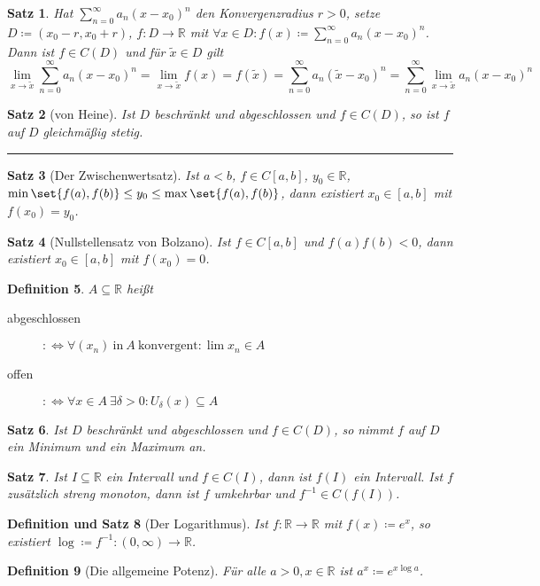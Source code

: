 \documentclass[a4paper]{article}
\newcounter{Sec}
\theoremstyle{marginbreak}
\newtheorem{definition}{Definition}[Sec]
\newtheorem{satz}[definition]{Satz}
\newtheorem{defsatz}[definition]{Definition und Satz}
\newcommand{\sep}{%
	\rule{\textwidth}{0.3pt}%
	\stepcounter{Sec}%
	}
\newcommand{\defiff}{:\Longleftrightarrow}
\newcommand{\series}[1][1]{\sum_{n=#1}^\infty}
\newcommand{\ps}[1][a]{\series[0]#1_n(x-x_0)^n}
\begin{document}
	\begin{satz}
		Hat $\ps$ den Konvergenzradius $r>0$, setze $D\coloneqq(x_0-r,x_0+r)$,
		$f\colon D\to\mathbb{R}$ mit $\forall x\in D:f(x)\coloneqq\ps$. Dann
		ist $f\in C(D)$ und für $\tilde{x}\in D$ gilt
		\[ \lim_{x\to\tilde{x}}\ps = \lim_{x\to\tilde{x}}f(x)=f(\tilde{x})=
		\sum_{n=0}^\infty a_n(\tilde{x}-x_0)^n=\sum_{n=0}^\infty\lim_{x\to\tilde{x}}a_n(x-x_0)^n \]
	\end{satz}
	\begin{satz}[von Heine]
		Ist $D$ beschränkt und abgeschlossen und $f\in C(D)$, so ist $f$ auf
		$D$ gleichmäßig stetig.
	\end{satz}
	\sep
	\begin{satz}[Der Zwischenwertsatz]
		Ist $a<b$, $f\in C[a,b]$, $y_0\in\mathbb{R}$, $\min\set{f(a),f(b)}\leq
		y_0\leq\max\set{f(a),f(b)}$, dann existiert $x_0\in[a,b]$ mit $f(x_0)=y_0$.
	\end{satz}
	\begin{satz}[Nullstellensatz von Bolzano]
		Ist $f\in C[a,b]$ und $f(a)f(b)<0$, dann existiert $x_0\in[a,b]$ mit $f(x_0)=0$.
	\end{satz}
	\begin{definition}
		$A\subseteq\mathbb{R}$ heißt
		\begin{description}
			\item[abgeschlossen] $\defiff\forall(x_n)~\text{in}~A~\text{konvergent}:\lim x_n\in A$
			\item[offen] $\defiff\forall x\in A~\exists\delta>0:U_\delta(x)\subseteq A$
		\end{description}
	\end{definition}
	\begin{satz}
		Ist $D$ beschränkt und abgeschlossen und $f\in C(D)$, so nimmt $f$ auf $D$
		ein Minimum und ein Maximum an.
	\end{satz}
	\begin{satz}
		Ist $I\subseteq\mathbb{R}$ ein Intervall und $f\in C(I)$, dann ist
		$f(I)$ ein Intervall. Ist $f$ zusätzlich streng monoton, dann ist $f$
		umkehrbar und $f^{-1}\in C(f(I))$.
	\end{satz}
	\begin{defsatz}[Der Logarithmus]
		Ist $f\colon\mathbb{R}\to\mathbb{R}$ mit $f(x)\coloneqq e^x$, so existiert
		$\log \coloneqq f^{-1}\colon (0,\infty)\to\mathbb{R}$.
	\end{defsatz}
	\begin{definition}[Die allgemeine Potenz]
		Für alle $a>0, x\in\mathbb{R}$ ist $a^x\coloneqq e^{x\log a}$.
	\end{definition}
\end{document}
